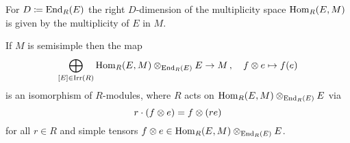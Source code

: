 \begin{corollary}
  \label{corollary: dimension of multiplicity space is multiplicity}
  For $D \coloneqq \operatorname{End}_R(E)$ the right $D$-dimension of the multiplicity space $\operatorname{Hom}_R(E,M)$ is given by the multiplicity of $E$ in $M$.
\end{corollary}


\begin{corollary}
  If $M$ is semisimple then the map
  \[
            \bigoplus_{[E] \in \operatorname{Irr}(R)} \operatorname{Hom}_R(E, M) \mathbin{\otimes}_{\operatorname{End}_R(E)} E
    \to     M \,,
    \quad   f \mathbin{\otimes} e
    \mapsto f(e)
  \]
  is an isomorphism of $R$-modules, where $R$ acts on $\operatorname{Hom}_R(E, M) \mathbin{\otimes}_{\operatorname{End}_R(E)} E$ via
  \[
      r \cdot (f \mathbin{\otimes} e)
    = f \mathbin{\otimes} (re)
  \]
  for all $r \in R$ and simple tensors $f \mathbin{\otimes} e \in \operatorname{Hom}_R(E, M) \mathbin{\otimes}_{\operatorname{End}_R(E)} E$.
\end{corollary}




